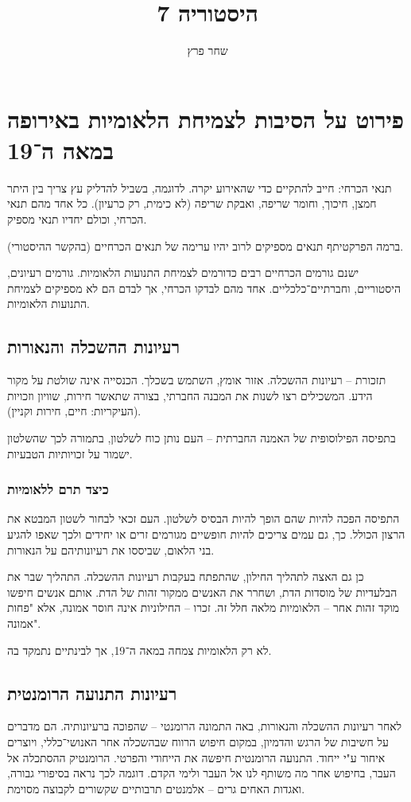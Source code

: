 \documentclass[]{article}
\author{שחר פרץ}
\title{היסטוריה 7}
\begin{document}
	\maketitle
	\section{פירוט על הסיבות לצמיחת הלאומיות באירופה במאה ה־19}
	תנאי הכרחי: חייב להתקיים כדי שהאירוע יקרה.
	לדוגמה, בשביל להדליק עץ צריך בין היתר חמצן, חיכוך, וחומר שריפה, ואבקת שריפה (לא כימית, רק כרעיון). כל אחד מהם תנאי הכרחי, וכולם יחדיו תנאי מספיק. 
	
	ברמה הפרקטיתף תנאים מספיקים לרוב יהיו ערימה של תנאים הכרחיים (בהקשר ההיסטורי). 
	
	ישנם גורמים הכרחיים רבים כדורמים לצמיחת התנועות הלאומיות. גורמים רעיונים, היסטוריים, וחברתיים־כלכליים. אחד מהם לבדקו הכרחי, אך לבדם הם לא מספיקים לצמיחת התנועות הלאומיות. 
	\subsection{רעיונות ההשכלה והנאורות}
	תזכורת – רעיונות ההשכלה. אזור אומץ, השתמש בשכלך. הכנסייה אינה שולטת על מקור הידע. המשכילים רצו לשנות את המבנה החברתי, בצורה שתאשר חירות, שוויון וזכויות (העיקריות: חיים, חירות וקניין). 
	
	בתפיסה הפילוסופית של האמנה החברתית – העם נותן כוח לשלטון, בתמורה לכך שהשלטון ישמור על זכויותיות הטבעיות. 
	\subsubsection{כיצד תרם ללאומיות}
	התפיסה הפכה להיות שהם הופך להיות הבסיס לשלטון. העם זכאי לבחור לשטון המבטא את הרצון הכולל. כך, גם עמים צריכים להיות חופשיים מגורמים זרים או יחידים ולכך שאפו להגיע בני הלאום, שביססו את רעיונותיהם על הנאורות. 
	
	כן גם האצה לתהליך החילון, שהתפתח בעקבות רעיונות ההשכלה. התהליך שבר את הבלעדיות של מוסדות הדת, ושחרר את האנשים ממקור זהות של הדת. אותם אנשים חיפשו מוקד זהות אחר – הלאומיות מלאה חלל זה. זכרו – החילוניות אינה חוסר אמונה, אלא "פחות אמונה". 
	
	לא רק הלאומיות צמחה במאה ה־19, אך לבינתיים נתמקד בה. 
	
	\subsection{רעיונות התנועה הרומנטית}
	לאחר רעיונות ההשכלה והנאורות, באה התמונה הרומנטי – שהפוכה ברעיונותיה. הם מדברים על חשיבות של הרגש והדמיון, במקום חיפוש הרווח שבהשכלה אחר האנושי־כללי, ויוצרים איחור ע"י ייחוד. התנועה הרומנטית חיפשה את הייחודי והפרטי. הרומנטיק ההסתכלה אל העבר, בחיפוש אחר מה משותף לנו אל העבר ולימי הקדם. דוגמה לכך נראה בסיפורי גבורה, ואגדות האחים גרים – אלמנטים תרבותיים שקשורים לקבוצה מסוימת. 
	
\end{document}
